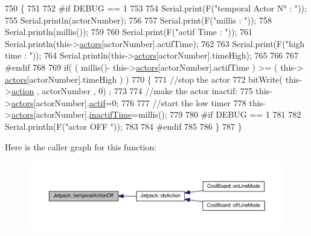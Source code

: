 \begin{DoxyCode}
750 \{
751 
752 \textcolor{preprocessor}{#if DEBUG == 1}
753     
754     Serial.print(F(\textcolor{stringliteral}{"temporal Actor N° : "}));
755     Serial.println(actorNumber);
756 
757     Serial.print(F(\textcolor{stringliteral}{"millis : "}));
758     Serial.println(millis());
759 
760     Serial.print(F(\textcolor{stringliteral}{"actif Time : "}));
761     Serial.println(this->\hyperlink{class_jetpack_a7e16d2f97837f9712a2e6de1c50d99db}{actors}[actorNumber].actifTime);
762 
763     Serial.print(F(\textcolor{stringliteral}{"high time : "}));
764     Serial.println(this->\hyperlink{class_jetpack_a7e16d2f97837f9712a2e6de1c50d99db}{actors}[actorNumber].timeHigh);
765 
766 
767 \textcolor{preprocessor}{#endif}
768     
769     \textcolor{keywordflow}{if}( ( millis()- this->\hyperlink{class_jetpack_a7e16d2f97837f9712a2e6de1c50d99db}{actors}[actorNumber].actifTime  ) >= (  this->
      \hyperlink{class_jetpack_a7e16d2f97837f9712a2e6de1c50d99db}{actors}[actorNumber].timeHigh  ) )
770     \{
771         \textcolor{comment}{//stop the actor}
772         bitWrite( this->\hyperlink{class_jetpack_aca3142925a7b0834b34ae91d26af7765}{action} , actorNumber , 0) ;
773 
774         \textcolor{comment}{//make the actor inactif:}
775         this->\hyperlink{class_jetpack_a7e16d2f97837f9712a2e6de1c50d99db}{actors}[actorNumber].\hyperlink{struct_jetpack_1_1state_aa177541689bbaea21a4650a083b0df77}{actif}=0;
776 
777         \textcolor{comment}{//start the low timer}
778         this->\hyperlink{class_jetpack_a7e16d2f97837f9712a2e6de1c50d99db}{actors}[actorNumber].\hyperlink{struct_jetpack_1_1state_aaf817b1f9e7a4d65b9e3ca4726b281f6}{inactifTime}=millis();
779 
780 \textcolor{preprocessor}{    #if DEBUG == 1 }
781 
782         Serial.println(F(\textcolor{stringliteral}{"actor OFF "}));
783     
784 \textcolor{preprocessor}{    #endif}
785                 
786     \}   
787 \}
\end{DoxyCode}
Here is the caller graph for this function\+:\nopagebreak
\begin{figure}[H]
\begin{center}
\leavevmode
\includegraphics[width=350pt]{df/d1d/class_jetpack_a2991b302cd99bf89325f9b66b104d575_icgraph}
\end{center}
\end{figure}
\mbox{\label{class_jetpack_ad011d904f639accb5f94ef806846ef59}} 
